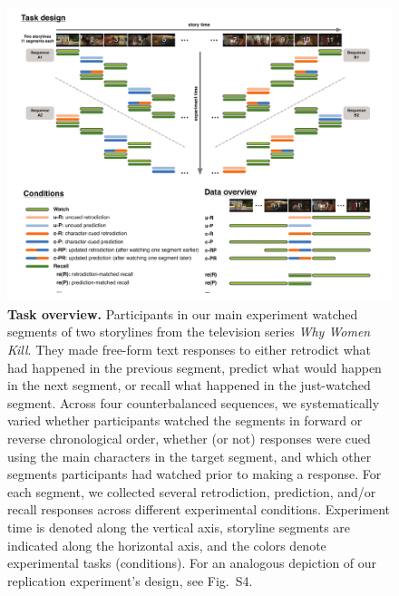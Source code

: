 \documentclass[10pt]{article}
\newcommand{\MethodsReplExp}{S4}
\begin{document}
\begin{figure}[tp]
  \centering
  \includegraphics[width=\textwidth]{methods}

  \caption{\textbf{Task overview.} Participants in our main experiment watched segments of two storylines from the television series \textit{Why Women Kill}. They made free-form text responses to either retrodict what had happened in the previous segment, predict what would happen in the next segment, or recall what happened in the just-watched segment. Across four counterbalanced sequences, we systematically varied whether participants watched the segments in forward or reverse chronological order, whether (or not) responses were cued using the main characters in the target segment, and which other segments participants had watched prior to making a response. For each segment, we collected several retrodiction, prediction, and/or recall responses across different experimental conditions. Experiment time is denoted along the vertical axis, storyline segments are indicated along the horizontal axis, and the colors denote experimental tasks (conditions). For an analogous depiction of our replication experiment's design, see Fig.~\MethodsReplExp.}

  \label{fig:method}
\end{figure}
\end{document}
